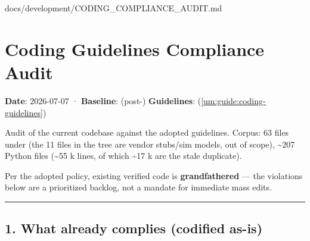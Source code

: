\begin{relocated}{docs/development/CODING_COMPLIANCE_AUDIT.md}
\section{Coding Guidelines Compliance Audit}\label{um:guide:coding-compliance-audit}

\textbf{Date}: 2026-07-07 · \textbf{Baseline}:  (post-) \textbf{Guidelines}:
 (\cref{um:guide:coding-guidelines})

Audit of the current codebase against the adopted guidelines. Corpus: 63
 files under  (the 11  files in the tree
are vendor stubs/sim models, out of scope), \textasciitilde207 Python
files (\textasciitilde55 k lines, of which \textasciitilde17 k are the
stale  duplicate).

Per the adopted policy, existing verified code is \textbf{grandfathered}
--- the violations below are a prioritized backlog, not a mandate for
immediate mass edits.

\begin{center}\rule{0.5\linewidth}{0.5pt}\end{center}

\subsection{1. What already complies (codified as-is)}\label{um:guide:coding-compliance-audit:1-what-already-complies-codified-as-is}

{\small\setlength{\tabcolsep}{4pt}

}
\end{relocated}
